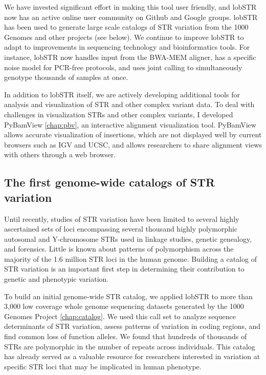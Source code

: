 We have invested significant effort in making this tool user friendly, and lobSTR now has an active online user community on Github and Google groups. lobSTR has been used to generate large scale catalogs of STR variation from the 1000 Genomes and other projects (see below). We continue to improve lobSTR to adapt to improvements in sequencing technology and bioinformatics tools. For instance, lobSTR now handles input from the BWA-MEM aligner, has a specific noise model for PCR-free protocols, and uses joint calling to simultaneously genotype thousands of samples at once.

In addition to lobSTR itself, we are actively developing additional tools for analysis and visualization of STR and other complex variant data. To deal with challenges in visualization STRs and other complex variants, I developed PyBamView \cite{Gymrek2014} \autoref{chap:pbv}, an interactive alignment visualization tool. PyBamView allows accurate visualization of insertions, which are not displayed well by current browsers such as IGV and UCSC, and allows researchers to share alignment views with others through a web browser.

\subsection{The first genome-wide catalogs of STR variation}
Until recently, studies of STR variation have been limited to several highly ascertained sets of loci encompassing several thousand highly polymorphic autosomal and Y-chromosome STRs used in linkage studies, genetic genealogy, and forensics. Little is known about patterns of polymorphism across the majority of the 1.6 million STR loci in the human genome. Building a catalog of STR variation is an important first step in determining their contribution to genetic and phenotypic variation.

To build an initial genome-wide STR catalog, we applied lobSTR to more than 3,000 low coverage whole genome sequencing datasets generated by the 1000 Genomes Project \cite{WillemsGymrekHighnamEtAl2014} \autoref{chap:catalog}. We used this call set to analyze sequence determinants of STR variation, assess patterns of variation in coding regions, and find common loss of function alleles. We found that hundreds of thousands of STRs are polymorphic in the number of repeats across individuals. This catalog has already served as a valuable resource for researchers interested in variation at specific STR loci that may be implicated in human phenotype. 

